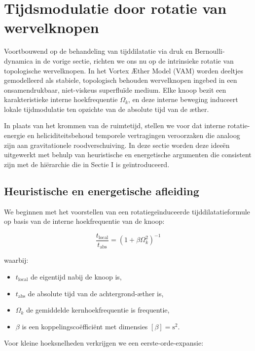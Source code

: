 \section{Tijdsmodulatie door rotatie van wervelknopen}

Voortbouwend op de behandeling van tijddilatatie via druk en Bernoulli-dynamica in de vorige sectie, richten we ons nu op de intrinsieke rotatie van topologische wervelknopen. In het Vortex Æther Model (VAM) worden deeltjes gemodelleerd als stabiele, topologisch behouden wervelknopen ingebed in een onsamendrukbaar, niet-viskeus superfluïde medium. Elke knoop bezit een karakteristieke interne hoekfrequentie $\Omega_k$, en deze interne beweging induceert lokale tijdmodulatie ten opzichte van de absolute tijd van de æther.

In plaats van het krommen van de ruimtetijd, stellen we voor dat interne rotatie-energie en heliciditeitsbehoud temporele vertragingen veroorzaken die analoog zijn aan gravitationele roodverschuiving. In deze sectie worden deze ideeën uitgewerkt met behulp van heuristische en energetische argumenten die consistent zijn met de hiërarchie die in Sectie I is geïntroduceerd.

\subsection{Heuristische en energetische afleiding}

We beginnen met het voorstellen van een rotatiegeïnduceerde tijddilatatieformule op basis van de interne hoekfrequentie van de knoop:

\begin{equation}
\frac{t_\text{local}}{t_\text{abs}} = \left(1 + \beta \Omega_k^2 \right)^{-1}\label{eq:rotational_induced_time_dilation}
\end{equation}

waarbij:

\begin{itemize}
\item $t_\text{local}$ de eigentijd nabij de knoop is,
\item $t_\text{abs}$ de absolute tijd van de achtergrond-æther is,
\item $\Omega_k$ de gemiddelde kernhoekfrequentie is frequentie,
\item $\beta$ is een koppelingscoëfficiënt met dimensies $[\beta] = \text{s}^2$.
\end{itemize}

Voor kleine hoeksnelheden verkrijgen we een eerste-orde-expansie:

